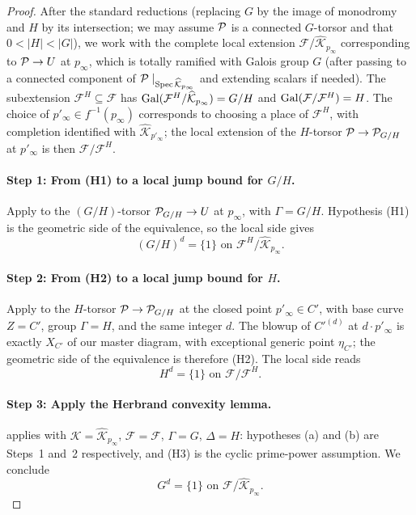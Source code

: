 \documentclass[11pt]{article}
\begin{document}
\begin{proof}
After the standard reductions (replacing $G$ by the image of monodromy and $H$
by its intersection; we may assume $\mathcal{P}$ is a connected $G$-torsor and that
$0 < |H| < |G|$), we work with the complete local extension
$\mathcal{F}/\widehat{\mathcal{K}}_{p_\infty}$ corresponding to $\mathcal{P} \to U$ at
$p_\infty$, which is totally ramified with Galois group $G$ (after passing to a
connected component of $\mathcal{P} \mid_{\operatorname{Spec} \widehat{\mathcal{K}}_{p_\infty}}$ and
extending scalars if needed). The subextension $\mathcal{F}^H \subseteq
\mathcal{F}$ has $\operatorname{Gal}(\mathcal{F}^H/\widehat{\mathcal{K}}_{p_\infty}) = G/H$
and $\operatorname{Gal}(\mathcal{F}/\mathcal{F}^H) = H$. The choice of $p'_\infty \in
f^{-1}(p_\infty)$ corresponds to choosing a place of $\mathcal{F}^H$, with
completion identified with $\widehat{\mathcal{K}}_{p'_\infty}$; the local
extension of the $H$-torsor $\mathcal{P} \to \mathcal{P}_{G/H}$ at $p'_\infty$ is then
$\mathcal{F}/\mathcal{F}^H$.

\paragraph{Step 1: From (H1) to a local jump bound for $G/H$.}
Apply  to the $(G/H)$-torsor $\mathcal{P}_{G/H} \to U$ at
$p_\infty$, with $\Gamma = G/H$. Hypothesis (H1) is the geometric side of the
equivalence, so the local side gives
\[
(G/H)^d = \{1\} \text{ on } \mathcal{F}^H/\widehat{\mathcal{K}}_{p_\infty}.
\]

\paragraph{Step 2: From (H2) to a local jump bound for $H$.}
Apply  to the $H$-torsor $\mathcal{P} \to \mathcal{P}_{G/H}$ at the
closed point $p'_\infty \in C'$, with base curve $Z = C'$, group $\Gamma = H$,
and the same integer $d$. The blowup of $C'^{(d)}$ at $d \cdot p'_\infty$ is
exactly $X_{C'}$ of our master diagram, with exceptional generic point
$\eta_{C'}$; the geometric side of the equivalence is therefore (H2). The local
side reads
\[
H^d = \{1\} \text{ on } \mathcal{F}/\mathcal{F}^H.
\]

\paragraph{Step 3: Apply the Herbrand convexity lemma.}
 applies with $\mathcal{K} =
\widehat{\mathcal{K}}_{p_\infty}$, $\mathcal{F} = \mathcal{F}$, $\Gamma = G$,
$\Delta = H$: hypotheses (a) and (b) are Steps~1 and~2 respectively, and (H3)
is the cyclic prime-power assumption. We conclude
\[
G^d = \{1\} \text{ on } \mathcal{F}/\widehat{\mathcal{K}}_{p_\infty}.
\]


\end{proof}
\end{document}
